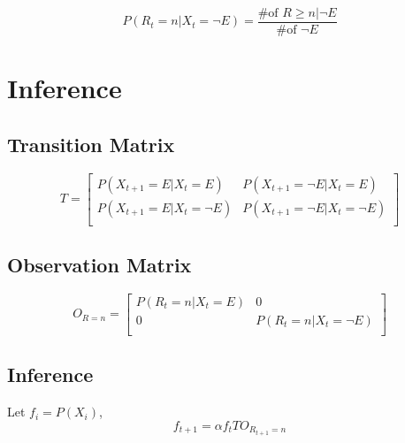 \documentclass[12pt]{article}
\begin{document}
\begin{equation}
P(R_{t}=n|X_{t}=\neg E)=\frac{\text{\# of } R \geq n|\neg E}{\text{\# of } \neg E}
\end{equation}

\section*{Inference}
\subsection*{Transition Matrix}
\begin{equation}
T=
\begin{bmatrix}
    P(X_{t+1}=E|X_{t}=E) & P(X_{t+1}=\neg E|X_{t}=E) \\
    P(X_{t+1}=E|X_{t}=\neg E) &P(X_{t+1}=\neg E|X_{t}=\neg E) \\

\end{bmatrix}
\end{equation}
\subsection*{Observation Matrix}
\begin{equation}
O_{R=n}=
\begin{bmatrix}
    P(R_{t}=n|X_{t}=E) & 0 \\
    0 &P(R_{t}=n|X_{t}=\neg E) \\

\end{bmatrix}
\end{equation}

\subsection*{Inference}
Let $f_{i}=P(X_{i})$,
\begin{equation}
f_{t+1}=\alpha f_{t}TO_{R_{t+1}=n}
\end{equation}
\end{document}
